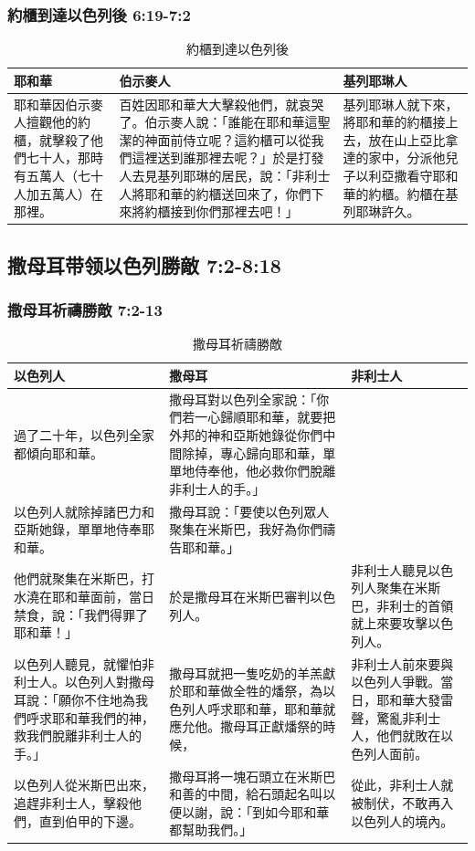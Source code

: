 \subsubsection{約櫃到達以色列後 6:19-7:2}
\begin{table}[!hbp]
\centering 
\begin{tabular}{p{3.3cm}|p{8.5cm}||p{5.2cm}}
\hline
\hline
耶和華&伯示麥人&基列耶琳人\\\hline
耶和華因伯示麥人擅觀他的約櫃，就擊殺了他們七十人，那時有五萬人（七十人加五萬人）在那裡。&百姓因耶和華大大擊殺他們，就哀哭了。伯示麥人說：「誰能在耶和華這聖潔的神面前侍立呢？這約櫃可以從我們這裡送到誰那裡去呢？」於是打發人去見基列耶琳的居民，說：「非利士人將耶和華的約櫃送回來了，你們下來將約櫃接到你們那裡去吧！」
&基列耶琳人就下來，將耶和華的約櫃接上去，放在山上亞比拿達的家中，分派他兒子以利亞撒看守耶和華的約櫃。約櫃在基列耶琳許久。\\\hline
\end{tabular}
\caption{約櫃到達以色列後}
\end{table}

\subsection{撒母耳带领以色列勝敵 7:2-8:18}
\subsubsection{撒母耳祈禱勝敵 7:2-13}
\begin{table}[H]
\centering 
\begin{tabular}{p{5.3cm}|p{6.5cm}||p{5.2cm}}
\hline
\hline
以色列人&撒母耳&非利士人\\\hline
過了二十年，以色列全家都傾向耶和華。
&撒母耳對以色列全家說：「你們若一心歸順耶和華，就要把外邦的神和亞斯她錄從你們中間除掉，專心歸向耶和華，單單地侍奉他，他必救你們脫離非利士人的手。」&\\\hline
以色列人就除掉諸巴力和亞斯她錄，單單地侍奉耶和華。&撒母耳說：「要使以色列眾人聚集在米斯巴，我好為你們禱告耶和華。」 &\\\hline
他們就聚集在米斯巴，打水澆在耶和華面前，當日禁食，說：「我們得罪了耶和華！」
&於是撒母耳在米斯巴審判以色列人。&非利士人聽見以色列人聚集在米斯巴，非利士的首領就上來要攻擊以色列人。\\\hline
以色列人聽見，就懼怕非利士人。以色列人對撒母耳說：「願你不住地為我們呼求耶和華我們的神，救我們脫離非利士人的手。」&撒母耳就把一隻吃奶的羊羔獻於耶和華做全牲的燔祭，為以色列人呼求耶和華，耶和華就應允他。撒母耳正獻燔祭的時候，&非利士人前來要與以色列人爭戰。當日，耶和華大發雷聲，驚亂非利士人，他們就敗在以色列人面前。 \\\hline
以色列人從米斯巴出來，追趕非利士人，擊殺他們，直到伯甲的下邊。&撒母耳將一塊石頭立在米斯巴和善的中間，給石頭起名叫以便以謝，說：「到如今耶和華都幫助我們。」&從此，非利士人就被制伏，不敢再入以色列人的境內。\\\hline
\end{tabular}
\caption{撒母耳祈禱勝敵}
\end{table}


